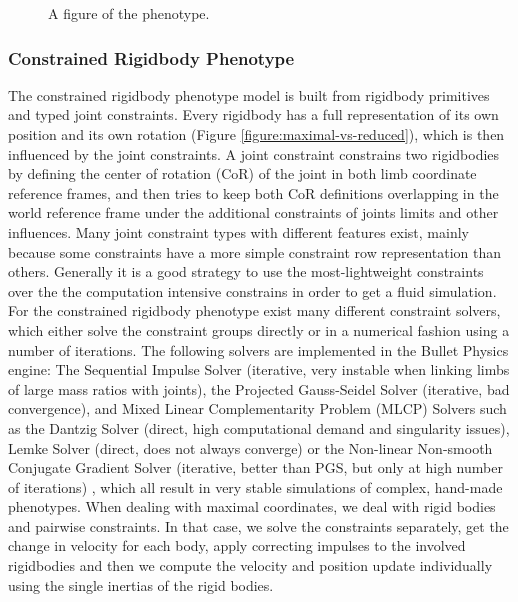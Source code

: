 \documentclass[main]{subfiles}
\begin{document}
\begin{figure}[H]
\centering


\caption[A figure of the phenotype]{A figure of the phenotype.}
\label{figure:direct-encoding}
\end{figure}

\subsubsection{Constrained Rigidbody Phenotype}

The constrained rigidbody phenotype model is built from rigidbody primitives and typed joint constraints. %
%
Every rigidbody has a full representation of its own position and its own rotation (Figure \ref{figure:maximal-vs-reduced}), which is then influenced by the joint constraints. %
%
A joint constraint constrains two rigidbodies by defining the center of rotation (CoR) of the joint in both limb coordinate reference frames, and then tries to keep both CoR definitions overlapping in the world reference frame under the additional constraints of joints limits and other influences.  %
%
Many joint constraint types with different features exist, mainly because some constraints have a more simple constraint row representation than others. %
%
Generally it is a good strategy to use the most-lightweight constraints over the the computation intensive constrains in order to get a fluid simulation. %
%
For the constrained rigidbody phenotype exist many different constraint solvers, which either solve the constraint groups directly or in a numerical fashion using a number of iterations. %
%
The following solvers are implemented in the Bullet Physics engine: The Sequential Impulse Solver (iterative, very instable when linking limbs of large mass ratios with joints), the Projected Gauss-Seidel Solver (iterative, bad convergence), and Mixed Linear Complementarity Problem (MLCP) Solvers such as the Dantzig Solver (direct, high computational demand and singularity issues), Lemke Solver (direct, does not always converge) or the Non-linear Non-smooth Conjugate Gradient Solver (iterative, better than PGS, but only at high number of iterations) \cite{bib::Coumans2014}, which all result in very stable simulations of complex, hand-made phenotypes. %
%
When dealing with maximal coordinates, we deal with rigid bodies and pairwise constraints. %
%
In that case, we solve the constraints separately, get the change in velocity for each body, apply correcting impulses to the involved rigidbodies and then we compute the velocity and position update individually using the single inertias of the rigid bodies. %
\end{document}
